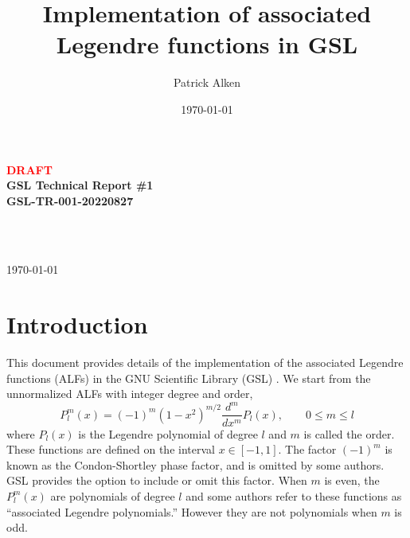 \documentclass[12pt]{article}
\title{Implementation of associated Legendre functions in GSL}
\author{Patrick Alken}
\date{\today}
\begin{document}
\begin{titlepage}

\thispagestyle{fancy}
\renewcommand{\headrulewidth}{0pt}
\cfoot{}

\begin{center}

\LARGE{\textbf{\textcolor{red}{DRAFT}}}\\
\LARGE{\textbf{GSL Technical Report \#1}}\\
\Large{\textbf{GSL-TR-001-20220827}}\\

\vspace{5 mm}

\Large{\color{HeadColor}{\textbf{\@title}}}\\

\vspace{5 mm}

\small{\@author}\\

\small{\today}

\setcounter{tocdepth}{1}

\tableofcontents

\end{center}

\end{titlepage}

\rfoot{\today \quad \textbar \quad {\bf \thepage}}

\pagestyle{fancy}
\fancyhf{}
\rfoot{\today \quad \textbar \quad {\bf \thepage}}
\renewcommand{\headrulewidth}{2pt}

\setcounter{page}{1}
\newpage

\section{Introduction}

This document provides details of the implementation of the
associated Legendre functions (ALFs) in the GNU Scientific
Library (GSL) \citep{GSL}. We start from the
unnormalized ALFs with integer degree and order,
\begin{equation}
P_l^m(x) = (-1)^m \left(1 - x^2 \right)^{m/2} \frac{d^m}{dx^m} P_l(x), \qquad 0 \leq m \leq l
\label{eqn:Plmdef}
\end{equation}
where $P_l(x)$ is the Legendre polynomial of degree $l$ and $m$ is
called the order. These functions are defined on the interval
$x \in [-1,1]$. The factor $(-1)^m$ is known as the Condon-Shortley
phase factor, and is omitted by some authors. GSL provides the option
to include or omit this factor. When $m$ is even, the $P_l^m(x)$ are
polynomials of degree $l$ and some authors refer to these functions
as ``associated Legendre polynomials.'' However they are not polynomials
when $m$ is odd.
\end{document}
